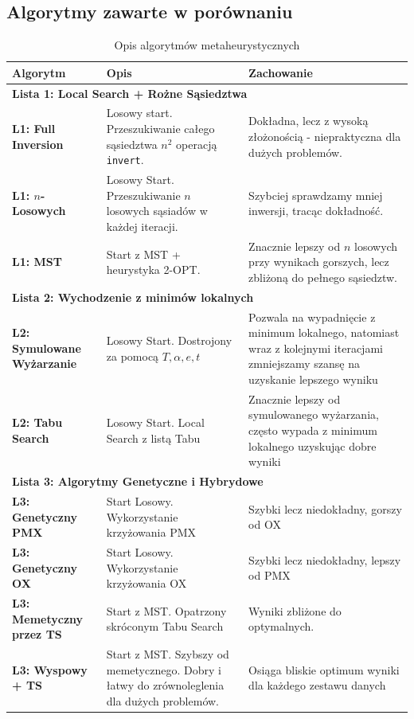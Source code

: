 \subsection{Algorytmy zawarte w porównaniu}
\begin{table}[htbp]
\centering
\caption{Opis algorytmów metaheurystycznych}
\small
\begin{tabularx}{\textwidth}{l p{5cm} X}
\toprule
\textbf{Algorytm} & \textbf{Opis} & \textbf{Zachowanie} \\ \midrule
\multicolumn{3}{l}{\textbf{Lista 1: Local Search + Rożne Sąsiedztwa}} \\ \midrule
\textbf{L1: Full Inversion} & Losowy start. Przeszukiwanie całego sąsiedztwa $n^2$ operacją \texttt{invert}. & Dokładna, lecz z wysoką złożonością - niepraktyczna dla dużych problemów. \\ \addlinespace
\textbf{L1: $n$-Losowych} & Losowy Start. Przeszukiwanie $n$ losowych sąsiadów w każdej iteracji. & Szybciej sprawdzamy mniej inwersji, tracąc dokładność. \\ \addlinespace
\textbf{L1: MST} & Start z MST + heurystyka 2-OPT. & Znacznie lepszy od $n$ losowych przy wynikach gorszych, lecz zbliżoną do pełnego sąsiedztw. \\ \midrule
\multicolumn{3}{l}{\textbf{Lista 2: Wychodzenie z minimów lokalnych}} \\ \midrule
\textbf{L2: Symulowane Wyżarzanie} & Losowy Start. Dostrojony za pomocą $T,\alpha,e,t$ & Pozwala na wypadnięcie z minimum lokalnego, natomiast wraz z kolejnymi iteracjami zmniejszamy szansę na uzyskanie lepszego wyniku \\ \addlinespace
\textbf{L2: Tabu Search} & Losowy Start. Local Search z listą Tabu & Znacznie lepszy od symulowanego wyżarzania, często wypada z minimum lokalnego uzyskując dobre wyniki \\ \midrule
\multicolumn{3}{l}{\textbf{Lista 3: Algorytmy Genetyczne i Hybrydowe}} \\ \midrule
\textbf{L3: Genetyczny PMX} & Start Losowy. Wykorzystanie krzyżowania PMX & Szybki lecz niedokładny, gorszy od OX \\ \addlinespace
\textbf{L3: Genetyczny OX} & Start Losowy. Wykorzystanie krzyżowania OX & Szybki lecz niedokładny, lepszy od PMX \\ \addlinespace
\textbf{L3: Memetyczny przez TS} & Start z MST. Opatrzony skróconym Tabu Search & Wyniki zbliżone do optymalnych. \\ \addlinespace
\textbf{L3: Wyspowy + TS} & Start z MST. Szybszy od memetycznego. Dobry i łatwy do zrównoleglenia dla dużych problemów. & Osiąga bliskie optimum wyniki dla każdego zestawu danych \\ \bottomrule
\end{tabularx}
\end{table}

